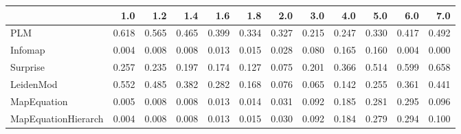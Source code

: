 \begin{tabular}{lrrrrrrrrrrr}
\toprule
{} &   1.0 &   1.2 &   1.4 &   1.6 &   1.8 &   2.0 &   3.0 &   4.0 &   5.0 &   6.0 &   7.0 \\
\midrule
PLM                 & 0.618 & 0.565 & 0.465 & 0.399 & 0.334 & 0.327 & 0.215 & 0.247 & 0.330 & 0.417 & 0.492 \\
Infomap             & 0.004 & 0.008 & 0.008 & 0.013 & 0.015 & 0.028 & 0.080 & 0.165 & 0.160 & 0.004 & 0.000 \\
Surprise            & 0.257 & 0.235 & 0.197 & 0.174 & 0.127 & 0.075 & 0.201 & 0.366 & 0.514 & 0.599 & 0.658 \\
LeidenMod           & 0.552 & 0.485 & 0.382 & 0.282 & 0.168 & 0.076 & 0.065 & 0.142 & 0.255 & 0.361 & 0.441 \\
MapEquation         & 0.005 & 0.008 & 0.008 & 0.013 & 0.014 & 0.031 & 0.092 & 0.185 & 0.281 & 0.295 & 0.096 \\
MapEquationHierarch & 0.004 & 0.008 & 0.008 & 0.013 & 0.015 & 0.030 & 0.092 & 0.184 & 0.279 & 0.294 & 0.100 \\
\bottomrule
\end{tabular}
